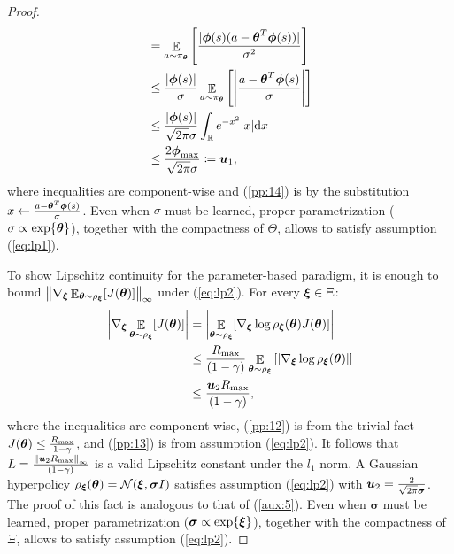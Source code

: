 \documentclass{article}
\begin{document}
\begin{proof}
\begin{align}
		&=\Exp_{a\sim\pi_{\vtheta}}\left[\frac{|\vphi(s)(a-\vtheta^T\vphi(s))|}{\sigma^2}\right] \nonumber\\
		&\leq \frac{|\vphi(s)|}{\sigma}\Exp_{a\sim\pi_{\vtheta}}\left[\left|\frac{a-\vtheta^T\vphi(s)}{\sigma}\right|\right] \nonumber\\
		&\leq \frac{|\vphi(s)|}{\sqrt{2\pi}\sigma}\int_{\Reals} e^{-x^2}|x|\de x \label{pp:14}\\
		& \leq  \frac{2\vphi_{\max}}{\sqrt{2\pi}\sigma}\coloneqq \vu_1, \label{aux:5}
	\end{align}
	where inequalities are component-wise and (\ref{pp:14}) is by the substitution $x\gets \frac{a-\vtheta^T\vphi(s)}{\sigma}$. Even when $\sigma$ must be learned, proper parametrization (\eg $\sigma\propto\exp\{\vtheta\}$), together with the compactness of $\Theta$, allows to satisfy assumption (\ref{eq:lp1}).
	
	To show Lipschitz continuity for the parameter-based paradigm, it is enough to bound $\norm[\infty]{\nabla_{\vxi}\Exp_{\vtheta\sim\rho_{\vxi}}[J(\vtheta)]}$ under (\ref{eq:lp2}). For every $\vxi\in\Xi$:
	\begin{align}
		\left|\nabla_{\vxi}\Exp_{\vtheta\sim\rho_{\vxi}}[J(\vtheta)]\right| &=
		\left|\Exp_{\vtheta\sim\rho_{\vxi}}[\nabla_{\vxi}\log\rho_{\vxi}(\vtheta)J(\vtheta)]\right| \nonumber\\
		&\leq \frac{\Rmax}{(1-\gamma)}\Exp_{\vtheta\sim\rho_{\vxi}}\left[\left|\nabla_{\vxi}\log\rho_{\vxi}(\vtheta)\right|\right] \label{pp:12} \\
		&\leq \frac{\vu_2\Rmax}{(1-\gamma)} \label{pp:13},
	\end{align}
	where the inequalities are component-wise, (\ref{pp:12}) is from the trivial fact $J(\vtheta)\leq\frac{\Rmax}{1-\gamma}$, and (\ref{pp:13}) is from assumption (\ref{eq:lp2}).
	It follows that $L=\frac{\norm[\infty]{\vu_2\Rmax}}{(1-\gamma)}$ is a valid Lipschitz constant under the $l_1$ norm.
	 A Gaussian hyperpolicy $\rho_{\vxi}(\vtheta) = \mathcal{N}(\vxi,\boldsymbol{\sigma}I)$ satisfies assumption (\ref{eq:lp2}) with $\vu_2 = \frac{2}{\sqrt{2\pi}\boldsymbol{\sigma}}$. The proof of this fact is analogous to that of (\ref{aux:5}). Even when $\boldsymbol{\sigma}$ must be learned, proper parametrization (\eg $\boldsymbol{\sigma}\propto\exp\{\vxi\}$), together with the compactness of $\Xi$, allows to satisfy assumption (\ref{eq:lp2}).
\end{proof}
\end{document}
